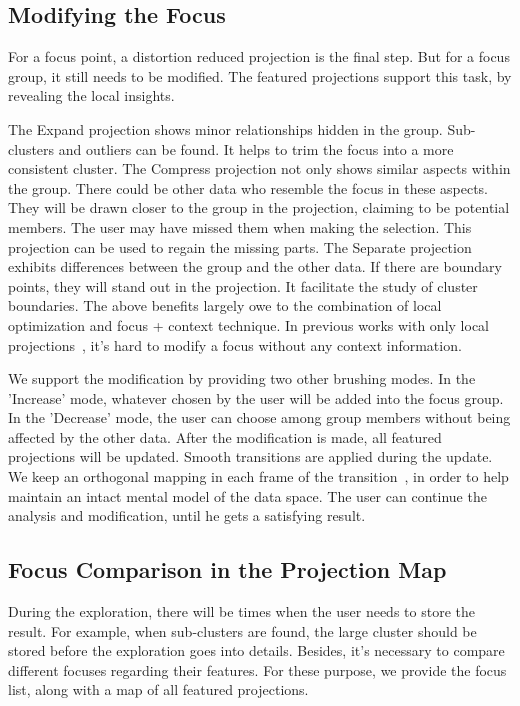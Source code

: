 
\subsection{Modifying the Focus}
For a focus point, a distortion reduced projection is the final step. But for a focus group, it still needs to be modified. The featured projections support this task, by revealing the local insights.

The Expand projection shows minor relationships hidden in the group. Sub-clusters and outliers can be found. It helps to trim the focus into a more consistent cluster. The Compress projection not only shows similar aspects within the group. There could be other data who resemble the focus in these aspects. They will be drawn closer to the group in the projection, claiming to be potential members. The user may have missed them when making the selection. This projection can be used to regain the missing parts. The Separate projection exhibits differences between the group and the other data. If there are boundary points, they will stand out in the projection. It facilitate the study of cluster boundaries. The above benefits largely owe to the combination of local optimization and focus + context technique. In previous works with only local projections~\cite{DBLP:journals/tvcg/YuanRWG13}, it's hard to modify a focus without any context information.

We support the modification by providing two other brushing modes. In the 'Increase' mode, whatever chosen by the user will be added into the focus group. In the 'Decrease' mode, the user can choose among group members without being affected by the other data. After the modification is made, all featured projections will be updated. Smooth transitions are applied during the update. We keep an orthogonal mapping in each frame of the transition~\cite{cook2004computational}, in order to help maintain an intact mental model of the data space. The user can continue the analysis and modification, until he gets a satisfying result.

\subsection{Focus Comparison in the Projection Map}
During the exploration, there will be times when the user needs to store the result. For example, when sub-clusters are found, the large cluster should be stored before the exploration goes into details. Besides, it's necessary to compare different focuses regarding their features. For these purpose, we provide the focus list, along with a map of all featured projections.

